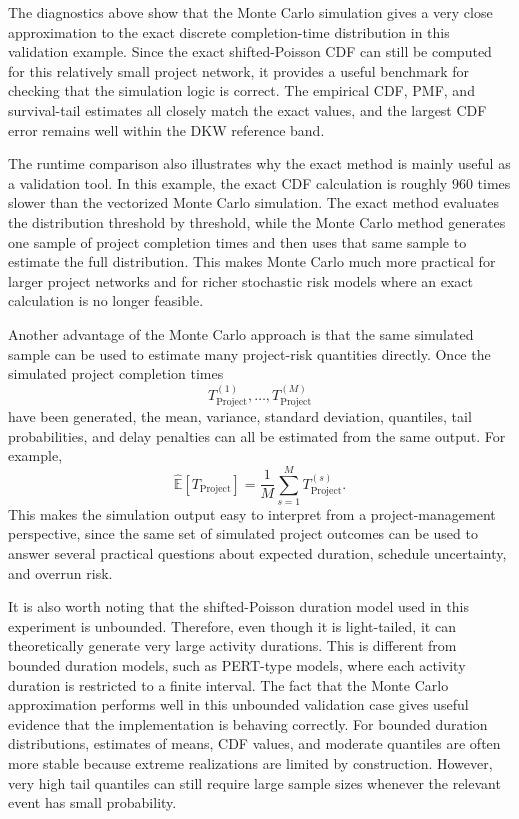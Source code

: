 \documentclass[11pt,a4paper]{article}
\providecommand{\E}{\mathbb{E}}
\newcommand{\E}{\mathbb{E}}
\newcommand{\1}{\mathbf{1}}
\theoremstyle{definition}
\theoremstyle{plain}
\theoremstyle{remark}
\numberwithin{equation}{section}
\begin{document}
The diagnostics above show that the Monte Carlo simulation gives a very close approximation to the exact discrete completion-time distribution in this validation example. Since the exact shifted-Poisson CDF can still be computed for this relatively small project network, it provides a useful benchmark for checking that the simulation logic is correct. The empirical CDF, PMF, and survival-tail estimates all closely match the exact values, and the largest CDF error remains well within the DKW reference band.

The runtime comparison also illustrates why the exact method is mainly useful as a validation tool. In this example, the exact CDF calculation is roughly $960$ times slower than the vectorized Monte Carlo simulation. The exact method evaluates the distribution threshold by threshold, while the Monte Carlo method generates one sample of project completion times and then uses that same sample to estimate the full distribution. This makes Monte Carlo much more practical for larger project networks and for richer stochastic risk models where an exact calculation is no longer feasible.

Another advantage of the Monte Carlo approach is that the same simulated sample can be used to estimate many project-risk quantities directly. Once the simulated project completion times
\[
T_{\text{Project}}^{(1)},\ldots,T_{\text{Project}}^{(M)}
\]
have been generated, the mean, variance, standard deviation, quantiles, tail probabilities, and delay penalties can all be estimated from the same output. For example,
\[
\widehat{\E}[T_{\text{Project}}]
=
\frac{1}{M}\sum_{s=1}^M T_{\text{Project}}^{(s)}.
\]
This makes the simulation output easy to interpret from a project-management perspective, since the same set of simulated project outcomes can be used to answer several practical questions about expected duration, schedule uncertainty, and overrun risk.

It is also worth noting that the shifted-Poisson duration model used in this experiment is unbounded. Therefore, even though it is light-tailed, it can theoretically generate very large activity durations. This is different from bounded duration models, such as PERT-type models, where each activity duration is restricted to a finite interval. The fact that the Monte Carlo approximation performs well in this unbounded validation case gives useful evidence that the implementation is behaving correctly. For bounded duration distributions, estimates of means, CDF values, and moderate quantiles are often more stable because extreme realizations are limited by construction. However, very high tail quantiles can still require large sample sizes whenever the relevant event has small probability.
\end{document}
